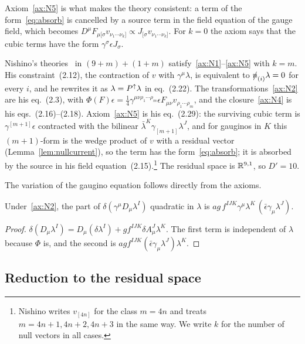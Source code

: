 Axiom~\ref{ax:N5} is what makes the theory consistent: a term of the form~\eqref{eq:absorb} is cancelled by a source term in the field equation of the gauge field, which becomes $D^\mu F_{\mu[\sigma}v_{\nu_1\cdots\nu_k]}\propto J_{[\sigma}v_{\nu_1\cdots\nu_k]}$. For $k=0$ the axiom says that the cubic terms have the form $\gamma^\sigma\epsilon J_\sigma$.

\begin{example}
\label{ex:nishino}
Nishino's theories~\cite{Nishino1998} in $(9+m)+(1+m)$ satisfy~\ref{ax:N1}--\ref{ax:N5} with $k=m$. His constraint~(2.12), the contraction of $v$ with $\gamma^\mu\lambda$, is equivalent to $\slashed{n}_{(i)}\lambda=0$ for every $i$, and he rewrites it as $\lambda=P^{\uparrow}\lambda$ in eq.~(2.22). The transformations~\ref{ax:N2} are his eq.~(2.3), with $\Phi(F)\epsilon=\frac14\gamma^{\mu\nu\rho_1\cdots\rho_m}\epsilon F_{\mu\nu}v_{\rho_1\cdots\rho_m}$, and the closure~\ref{ax:N4} is his eqs.~(2.16)--(2.18). Axiom~\ref{ax:N5} is his eq.~(2.29): the surviving cubic term is $\gamma^{[m+1]}\epsilon$ contracted with the bilinear $\bar\lambda^K\gamma_{[m+1]}\lambda^J$, and for gauginos in $K$ this $(m+1)$-form is the wedge product of $v$ with a residual vector (Lemma~\ref{lem:nullcurrent}), so the term has the form~\eqref{eq:absorb}; it is absorbed by the source in his field equation~(2.15).\footnote{Nishino writes $v_{[4n]}$ for the class $m=4n$ and treats $m=4n+1,4n+2,4n+3$ in the same way. We write $k$ for the number of null vectors in all cases.} The residual space is $\mathbb{R}^{9,1}$, so $D'=10$.
\end{example}

The variation of the gaugino equation follows directly from the axioms.

\begin{lemma}
\label{lem:quadratic}
Under~\ref{ax:N2}, the part of $\delta(\gamma^\mu D_\mu\lambda^I)$ quadratic in $\lambda$ is $ag\,f^{IJK}\gamma^\mu\lambda^K\,(\bar\epsilon\gamma_\mu\lambda^J)$.
\end{lemma}

\begin{proof}
$\delta(D_\mu\lambda^I)=D_\mu(\delta\lambda^I)+gf^{IJK}\delta A^J_\mu\lambda^K$. The first term is independent of $\lambda$ because $\Phi$ is, and the second is $ag f^{IJK}(\bar\epsilon\gamma_\mu\lambda^J)\lambda^K$.
\end{proof}

\subsection{Reduction to the residual space}

